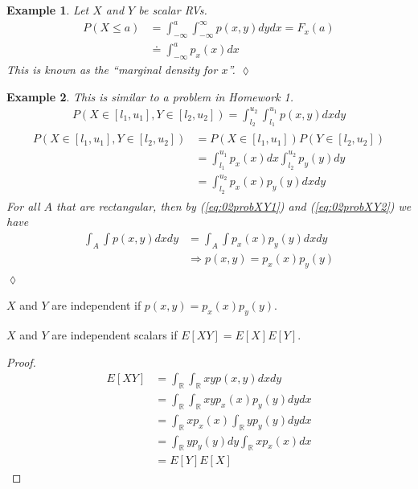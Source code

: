 \documentclass[lecture,12pt,]{pcms-l}
\theoremstyle{example}
\newtheorem{example}{Example}[section]
\begin{document}
\begin{example}
Let $X$ and $Y$ be scalar RVs.
\begin{align*}
P(X\leq a) &= \int_{-\infty}^a \int_{-\infty}^\infty p(x,y)dydx = F_x(a) \\
&\doteq \int_{-\infty}^a p_x(x)dx
\end{align*}
This is known as the ``marginal density for $x$''.
$\lozenge$
\end{example}

\begin{example}
This is similar to a problem in Homework 1.
\begin{align}
\label{eq:02probXY1}
P(X\in[l_1,u_1], Y\in[l_2,u_2]) = \int_{l_2}^{u_2} \int_{l_1}^{u_1} p(x,y)dxdy
\end{align}
\begin{align}
\label{eq:02probXY2}
\begin{split}
P(X\in[l_1,u_1], Y\in[l_2,u_2]) &= P(X\in[l_1,u_1]) P(Y\in[l_2,u_2]) \\
&= \int_{l_1}^{u_1}p_x(x)dx \int_{l_2}^{u_2}p_y(y)dy \\
&= \int_{l_2}^{u_2}p_x(x)p_y(y)dxdy
\end{split}
\end{align}
For all $A$ that are rectangular, then by (\ref{eq:02probXY1}) and (\ref{eq:02probXY2}) we have
\begin{align*}
\int_A\int p(x,y)dxdy &= \int_A\int p_x(x)p_y(y)dxdy \\
&\Rightarrow p(x,y) = p_x(x)p_y(y)
\end{align*}
$\lozenge$
\end{example}

\begin{theorem}
$X$ and $Y$ are independent if $p(x,y) = p_x(x)p_y(y)$.
\end{theorem}

\begin{theorem}
$X$ and $Y$ are independent scalars if $E[XY] = E[X]E[Y]$.
\end{theorem}

\begin{proof}
\begin{align*}
E[XY] &= \int_\mathbb{R}\int_\mathbb{R} xyp(x,y)dxdy \\
&= \int_\mathbb{R}\int_\mathbb{R} xyp_x(x)p_y(y)dydx \\
&= \int_\mathbb{R} xp_x(x)\int_\mathbb{R} yp_y(y)dydx \\
&= \int_\mathbb{R} yp_y(y)dy \int_\mathbb{R} xp_x(x)dx \\
&= E[Y]E[X]
\end{align*}
\end{proof}
\end{document}
